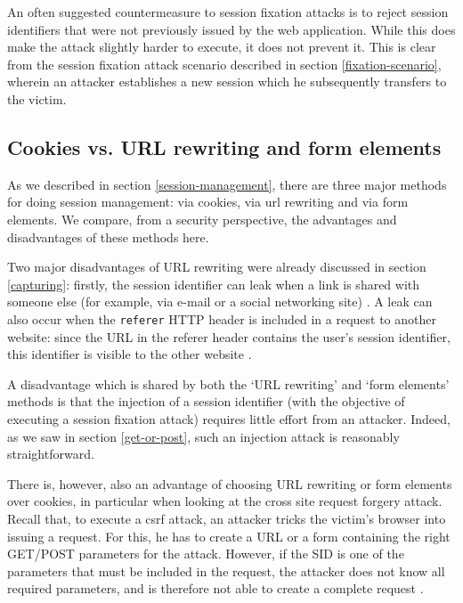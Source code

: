 An often suggested countermeasure to session fixation attacks is to reject session identifiers that were not previously issued by the web application. While this does make the attack slightly harder to execute, it does not prevent it. This is clear from the session fixation attack scenario described in section \ref{fixation-scenario}, wherein an attacker establishes a new session which he subsequently transfers to the victim.

\subsection{Cookies vs. URL rewriting and form elements}\label{url-vs-cookies}

As we described in section \ref{session-management}, there are three major methods for doing session management: via \glspl{cookie}, via \gls{url} rewriting and via form elements. We compare, from a security perspective, the advantages and disadvantages of these methods here.

Two major disadvantages of URL rewriting were already discussed in section \ref{capturing}: firstly, the session identifier can leak when a link is shared with someone else (for example, via e-mail or a social networking site) \cite{Johnston2004}. A leak can also occur when the \texttt{referer} HTTP header is included in a request to another website: since the URL in the referer header contains the user's session identifier, this identifier is visible to the other website \cite{Fu2001}.

A disadvantage which is shared by both the `URL rewriting' and `form elements' methods is that the injection of a session identifier (with the objective of executing a session fixation attack) requires little effort from an attacker. Indeed, as we saw in section \ref{get-or-post}, such an injection attack is reasonably straightforward.

There is, however, also an advantage of choosing URL rewriting or form elements over cookies, in particular when looking at the cross site request forgery attack. Recall that, to execute a \gls{csrf} attack, an attacker tricks the victim's browser into issuing a request. For this, he  has to create a URL or a form containing the right GET/POST parameters for the attack. However, if the SID is one of the parameters that must be included in the request, the attacker does not know all required parameters, and is therefore not able to create a complete request \cite{Johnston2004}.

